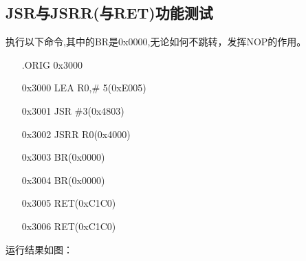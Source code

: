 \documentclass[UTF8]{ctexart}
\begin{document}
\subsection{JSR与JSRR(与RET)功能测试}
执行以下命令,其中的BR是0x0000,无论如何不跳转，发挥NOP的作用。
\begin{enumerate}
  \item [ ] .ORIG 0x3000
  \item [0x3000] LEA R0,\# 5(0xE005)
  \item [0x3001] JSR \#3(0x4803)
  \item [0x3002] JSRR R0(0x4000)
  \item [0x3003] BR(0x0000)
  \item [0x3004] BR(0x0000)
  \item [0x3005] RET(0xC1C0)
  \item [0x3006] RET(0xC1C0)
\end{enumerate}
运行结果如图：
\end{document}
